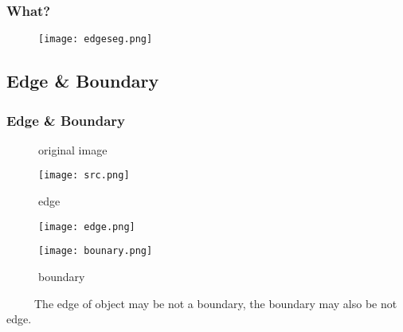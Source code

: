 \documentclass[notheorems,serif,table,compress]{beamer}  %
\begin{document}


\begin{frame}[fragile]
\frametitle{What?}
    \begin{figure}
    \texttt{[image: edgeseg.png]} 
    \end{figure}
\end{frame}



\subsection{Edge \& Boundary}
\begin{frame}
\frametitle{Edge \& Boundary}
\begin{tcolorbox}[colback=red!5,colframe=blue!75!black]
    \begin{figure}
    \begin{minipage}[t]{0.3\linewidth}
    \centering
    \caption{original image}
    \texttt{[image: src.png]} 
    \end{minipage}
    \begin{minipage}[t]{0.3\linewidth}
    \centering
    \caption{edge}
    \texttt{[image: edge.png]} 
    \end{minipage}
    \begin{minipage}[t]{0.3\linewidth}
    \centering
    \caption{boundary}
    \texttt{[image: bounary.png]} 
    \end{minipage}
    \end{figure}
\end{tcolorbox}

~~~~~The edge of object may be not a boundary, the boundary may also be not edge.
\end{frame}
 
 
\end{document}
